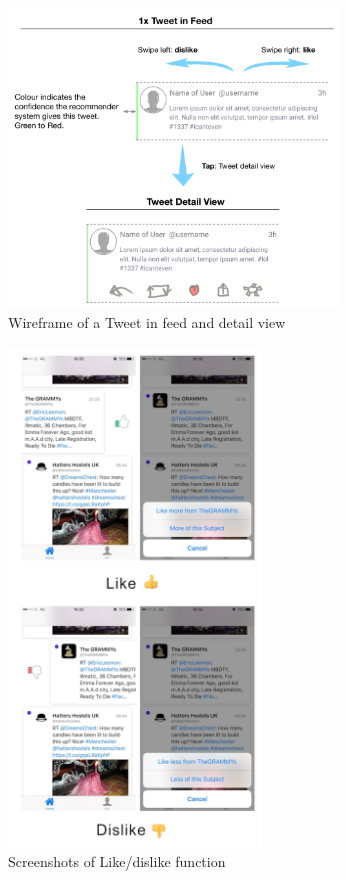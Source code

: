 \documentclass{article}
\begin{document}
\begin{figure}[H]
    \centering
    \includegraphics[width=0.78\textwidth]{ios_wireframe_2}  
    \caption{Wireframe of a Tweet in feed and detail view}
\end{figure}


\newpage


\begin{figure}[H]
    \centering
    \includegraphics[width=0.6\textwidth]{like_dislike}  
    \caption{Screenshots of Like/dislike function}
\end{figure}
\end{document}
